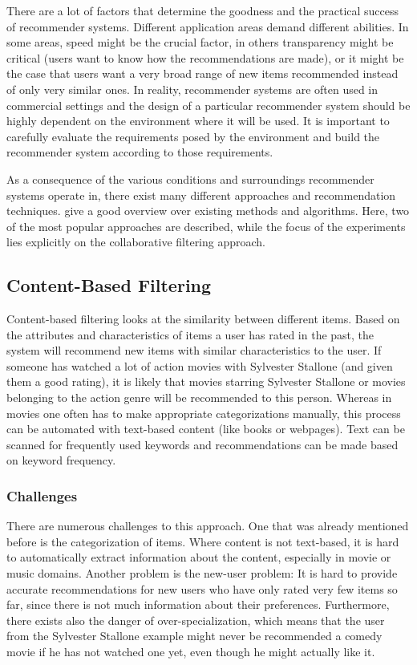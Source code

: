 There are a lot of factors that determine the goodness and the practical success of recommender systems. Different application areas demand different abilities. In some areas, speed might be the crucial factor, in others transparency might be critical (users want to know how the recommendations are made), or it might be the case that users want a very broad range of new items recommended instead of only very similar ones. In reality, recommender systems are often used in commercial settings and the design of a particular recommender system should be highly dependent on the environment where it will be used. It is important to carefully evaluate the requirements posed by the environment and build the recommender system according to those requirements.
\newline

As a consequence of the various conditions and surroundings recommender systems operate in, there exist many different approaches and recommendation techniques. \cite{Ricci_2011} give a good overview over existing methods and algorithms. Here, two of the most popular approaches are described, while the focus of the experiments lies explicitly on the collaborative filtering approach.

\subsection{Content-Based Filtering}
\label{sst:contentbasedfiltering} Content-based filtering looks at the similarity between different items. Based on the attributes and characteristics of items a user has rated in the past, the system will recommend new items with similar characteristics to the user. If someone has watched a lot of action movies with Sylvester Stallone (and given them a good rating), it is likely that movies starring Sylvester Stallone or movies belonging to the action genre will be recommended to this person. Whereas in movies one often has to make appropriate categorizations manually, this process can be automated with text-based content (like books or webpages). Text can be scanned for frequently used keywords and recommendations can be made based on keyword frequency.

\subsubsection{Challenges}
\label{ssst:challenges} There are numerous challenges to this approach. One that was already mentioned before is the categorization of items. Where content is not text-based, it is hard to automatically extract information about the content, especially in movie or music domains. Another problem is the new-user problem: It is hard to provide accurate recommendations for new users who have only rated very few items so far, since there is not much information about their preferences. Furthermore, there exists also the danger of over-specialization, which means that the user from the Sylvester Stallone example might never be recommended a comedy movie if he has not watched one yet, even though he might actually like it.

